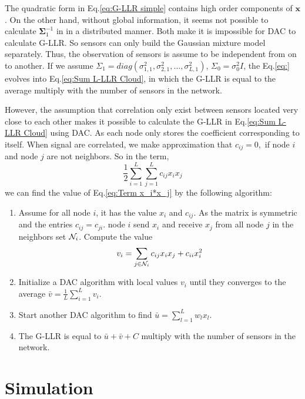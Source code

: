 The quadratic form in Eq.\ref{eq:G-LLR simple} contains high order
components of $\mathbf{x}$. On the other hand, without global information,
it seems not possible to calculate $\mathbf{\Sigma}_{1}^{-1}$ in
in a distributed manner. Both make it is impossible for DAC to calculate
G-LLR. So sensors can only build the Gaussian mixture model separately.
Thus, the observation of sensors is assume to be independent from
on to another. If we assume $\Sigma_{1}=diag\left(\sigma_{1,1}^{2},\sigma_{2,1}^{2},\ldots,\sigma_{L,1}^{2}\right)$,
$\Sigma_{0}=\sigma_{0}^{2}I$, the Eq.\ref{eq:} evolves into Eq.\ref{eq:Sum L-LLR Cloud},
in which the G-LLR is equal to the average multiply with the number
of sensors in the network. 

However, the assumption that correlation only exist between sensors
located very close to each other makes it possible to calculate the
G-LLR in Eq.\ref{eq:Sum L-LLR Cloud} using DAC. As each node only
stores the coefficient corresponding to itself. When signal are correlated,
we make approximation that $c_{ij}=0,$ if node $i$ and node $j$
are not neighbors. So in the term, 
\begin{equation}
\frac{1}{2}\sum_{i=1}^{L}\sum_{j=1}^{L}c_{ij}x_{i}x_{j}\label{eq:Term x_i*x_j}
\end{equation}
we can find the value of Eq.\ref{eq:Term x_i*x_j} by the following
algorithm:
\begin{enumerate}
\item Assume for all node $i$, it has the value $x_{i}$ and $c_{ij}$.
As the matrix is symmetric and the entries $c_{ij}=c_{ji}$. node
$i$ send $x_{i}$ and receive $x_{j}$ from all node $j$ in the
neighbors set ${\cal N}_{i}$. Compute the value 
\begin{equation}
v_{i}=\sum_{j\in{\cal N}_{i}}c_{ij}x_{i}x_{j}+c_{ii}x_{i}^{2}
\end{equation}

\item Initialize a DAC algorithm with local values $v_{i}$ until they converges
to the average $\bar{v}=\frac{1}{L}\sum_{i=1}^{L}v_{i}$. 
\item Start another DAC algorithm to find $\bar{u}=\sum_{l=1}^{L}w_{l}x_{l}$. 
\item The G-LLR is equal to $\bar{u}+\bar{v}+C$ multiply with the number
of sensors in the network.
\end{enumerate}

\section{Simulation\label{sec:Simulation}}

